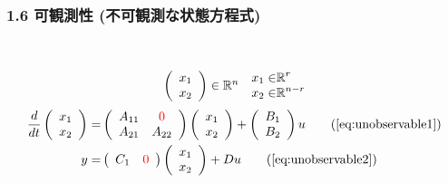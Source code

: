 \begin{frame}[t]
\frametitle{1.6 可観測性 (不可観測な状態方程式)}

\ \vspace*{-1.1cm}

  \begin{align}
    \begin{array}{cc}
      \left(
        \begin{array}{c}
           x_1 \\  x_2
        \end{array}
      \right)\in \mathbb{R}^{n} &
      \begin{aligned}
         x_1 \in& \mathbb{R}^r \\
         x_2 \in& \mathbb{R}^{n-r} \\
      \end{aligned}
    \end{array} \notag
  \end{align}
  \begin{align}
    \frac{d}{dt}
    \left(
      \begin{array}{c}
        x_1 \\ x_2
      \end{array}
    \right) =& \left(
      \begin{array}{cc}
        A_{11} & \textcolor{red}{0} \\ A_{21} & A_{22}
      \end{array}
    \right)
    \left(
      \begin{array}{c}
        x_1 \\ x_2
      \end{array}
    \right) +
    \left(
      \begin{array}{c}
        B_1 \\ B_2
      \end{array}
    \right) u \tag{\ref{eq:unobservable1}}\\
    y =& \left(
      \begin{array}{cc}
        C_1 & \textcolor{red}{0}
      \end{array}
    \right)
    \left(
      \begin{array}{c}
        x_1 \\ x_2
      \end{array}
    \right) + D u \tag{\ref{eq:unobservable2}}
  \end{align}
  \begin{tikzpicture}[every node/.style={thick,circle,inner sep=0pt},overlay,blue]

\end{tikzpicture}
\end{frame}
